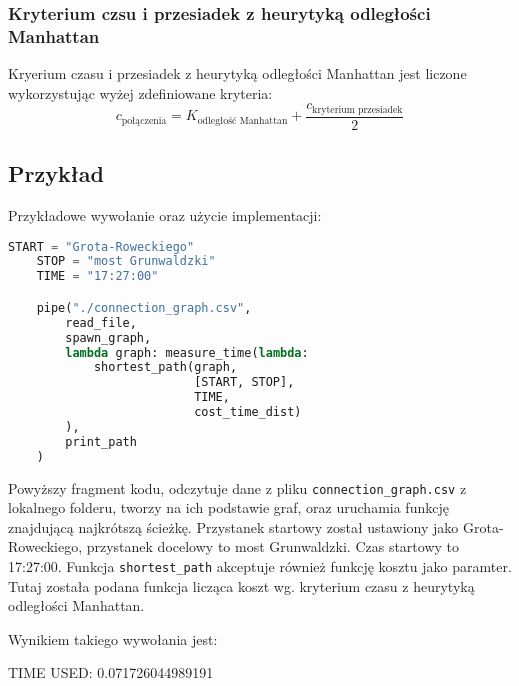 \documentclass[12pt,a4paper]{article}
\begin{document}
    \subsubsection*{Kryterium czsu i przesiadek z heurytyką odległości Manhattan}
    Kryerium czasu i przesiadek z heurytyką odległości Manhattan jest liczone wykorzystując wyżej zdefiniowane kryteria:
    $$c_{\text{połączenia}} = K_{\text{odległość Manhattan}} + \frac{c_{\text{kryterium przesiadek}}}{2}$$
    \subsection*{Przykład}
    Przykładowe wywołanie oraz użycie implementacji:
\begin{lstlisting}[language=Python]
    START = "Grota-Roweckiego"
    STOP = "most Grunwaldzki"
    TIME = "17:27:00"

    pipe("./connection_graph.csv",
        read_file,
        spawn_graph,
        lambda graph: measure_time(lambda:
            shortest_path(graph,
                          [START, STOP],
                          TIME,
                          cost_time_dist)
        ),
        print_path
    )
\end{lstlisting}

    Powyższy fragment kodu, odczytuje dane z pliku \texttt{connection\_graph.csv} z lokalnego folderu, tworzy na ich podstawie graf, oraz uruchamia funkcję znajdującą najkrótszą ścieżkę. Przystanek startowy został ustawiony jako Grota-Roweckiego, przystanek docelowy to most Grunwaldzki. Czas startowy to 17:27:00. Funkcja \texttt{shortest\_path} akceptuje również funkcję kosztu jako paramter. Tutaj została podana funkcja licząca koszt wg. kryterium czasu z heurytyką odległości Manhattan.

    Wynikiem takiego wywołania jest:

    TIME USED:  0.071726044989191
\end{document}

